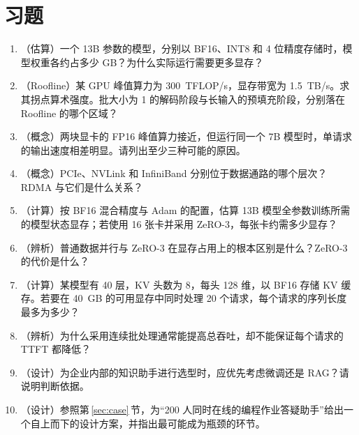 \section*{习题}

\begin{enumerate}[label=\thechapter.\arabic*,leftmargin=2.6em,itemsep=4pt]
  \item （估算）一个 13B 参数的模型，分别以 BF16、INT8 和 4 位精度存储时，模型权重各约占多少 GB？为什么实际运行需要更多显存？
  \item （Roofline）某 GPU 峰值算力为 \SI{300}{TFLOP/s}，显存带宽为 \SI{1.5}{TB/s}。求其拐点算术强度。批大小为 1 的解码阶段与长输入的预填充阶段，分别落在 Roofline 的哪个区域？
  \item （概念）两块显卡的 FP16 峰值算力接近，但运行同一个 7B 模型时，单请求的输出速度相差明显。请列出至少三种可能的原因。
  \item （概念）PCIe、NVLink 和 InfiniBand 分别位于数据通路的哪个层次？RDMA 与它们是什么关系？
  \item （计算）按 BF16 混合精度与 Adam 的配置，估算 13B 模型全参数训练所需的模型状态显存；若使用 16 张卡并采用 ZeRO-3，每张卡约需多少显存？
  \item （辨析）普通数据并行与 ZeRO-3 在显存占用上的根本区别是什么？ZeRO-3 的代价是什么？
  \item （计算）某模型有 40 层，KV 头数为 8，每头 128 维，以 BF16 存储 KV 缓存。若要在 \SI{40}{GB} 的可用显存中同时处理 20 个请求，每个请求的序列长度最多为多少？
  \item （辨析）为什么采用连续批处理通常能提高总吞吐，却不能保证每个请求的 TTFT 都降低？
  \item （设计）为企业内部的知识助手进行选型时，应优先考虑微调还是 RAG？请说明判断依据。
  \item （设计）参照第\,\ref{sec:case}\,节，为“200 人同时在线的编程作业答疑助手”给出一个自上而下的设计方案，并指出最可能成为瓶颈的环节。
\end{enumerate}

